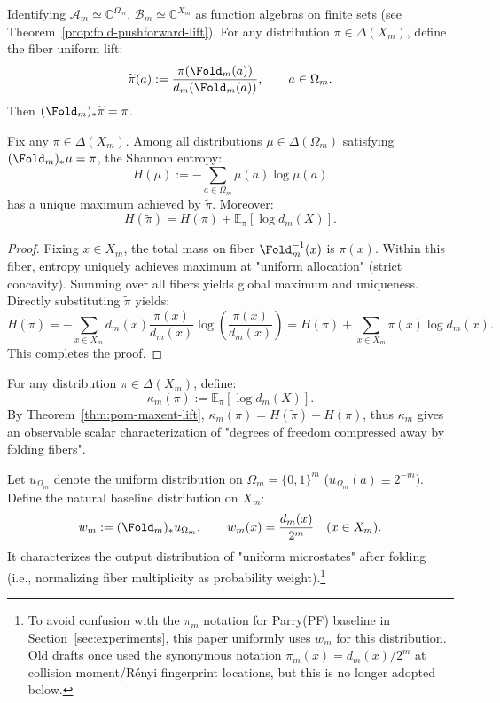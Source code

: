 \begin{definition}\label{def:pom-maxent-lift}
Identifying $\mathcal{A}_m\simeq\mathbb{C}^{\Omega_m}$, $\mathcal{B}_m\simeq\mathbb{C}^{X_m}$ as function algebras on finite sets (see Theorem~\ref{prop:fold-pushforward-lift}). For any distribution $\pi\in\Delta(X_m)$, define the fiber uniform lift:
\[
\widetilde\pi(a):=\frac{\pi(\Fold_m(a))}{d_m(\Fold_m(a))},\qquad a\in\Omega_m.
\]
Then $(\Fold_m)_*\widetilde\pi=\pi$.
\end{definition}

\begin{theorem}\label{thm:pom-maxent-lift}
Fix any $\pi\in\Delta(X_m)$. Among all distributions $\mu\in\Delta(\Omega_m)$ satisfying $(\Fold_m)_*\mu=\pi$, the Shannon entropy:
\[
H(\mu):=-\sum_{a\in\Omega_m}\mu(a)\log\mu(a)
\]
has a unique maximum achieved by $\widetilde\pi$. Moreover:
\[
H(\widetilde\pi)=H(\pi)+\mathbb{E}_{\pi}[\log d_m(X)].
\]
\end{theorem}
\begin{proof}
Fixing $x\in X_m$, the total mass on fiber $\Fold_m^{-1}(x)$ is $\pi(x)$. Within this fiber, entropy uniquely achieves maximum at "uniform allocation" (strict concavity). Summing over all fibers yields global maximum and uniqueness. Directly substituting $\widetilde\pi$ yields:
\[
H(\widetilde\pi)
=-\sum_{x\in X_m}d_m(x)\frac{\pi(x)}{d_m(x)}\log\!\left(\frac{\pi(x)}{d_m(x)}\right)
=H(\pi)+\sum_{x\in X_m}\pi(x)\log d_m(x).
\]
This completes the proof.
\end{proof}

\begin{definition}\label{def:pom-kappa}
For any distribution $\pi\in\Delta(X_m)$, define:
\[
\kappa_m(\pi):=\mathbb{E}_{\pi}[\log d_m(X)].
\]
By Theorem~\ref{thm:pom-maxent-lift}, $\kappa_m(\pi)=H(\widetilde\pi)-H(\pi)$, thus $\kappa_m$ gives an observable scalar characterization of "degrees of freedom compressed away by folding fibers".
\end{definition}

\begin{definition}\label{def:pom-wm-baseline}
Let $u_{\Omega_m}$ denote the uniform distribution on $\Omega_m=\{0,1\}^m$ ($u_{\Omega_m}(a)\equiv 2^{-m}$).
Define the natural baseline distribution on $X_m$:
\[
w_m:=(\Fold_m)_*u_{\Omega_m},\qquad
w_m(x)=\frac{d_m(x)}{2^m}\quad(x\in X_m).
\]
It characterizes the output distribution of "uniform microstates" after folding (i.e., normalizing fiber multiplicity as probability weight).\footnote{To avoid confusion with the $\pi_m$ notation for Parry(PF) baseline in Section~\ref{sec:experiments}, this paper uniformly uses $w_m$ for this distribution. Old drafts once used the synonymous notation $\pi_m(x)=d_m(x)/2^m$ at collision moment/Rényi fingerprint locations, but this is no longer adopted below.}
\end{definition}


